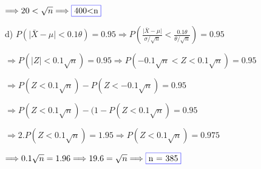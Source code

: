 \documentclass{article}
\providecommand{\abs}[1]{\lvert#1\rvert}
\begin{document}
$\Longrightarrow 20<\sqrt{n} \Longrightarrow \fcolorbox{blue}{white}{400<n}$
\vspace{6mm}

d)
$P(\abs{\bar{X}-\mu}<0.1\theta) = 0.95 \Longrightarrow P(\frac{\abs{\bar{X}-\mu}}{\sigma/\sqrt{n}}<\frac{0.1\theta}{\theta/\sqrt{n}}) = 0.95 $
\vspace{3mm}

$\Longrightarrow P(\abs{Z}<0.1\sqrt{n}) = 0.95 \Longrightarrow P(-0.1\sqrt{n}<Z<0.1\sqrt{n}) = 0.95 $
\vspace{3mm}

$\Longrightarrow P(Z<0.1\sqrt{n})-P(Z<-0.1\sqrt{n}) = 0.95 $
\vspace{3mm}

$\Longrightarrow P(Z<0.1\sqrt{n})-(1 -P(Z<0.1\sqrt{n}) = 0.95 $
\vspace{3mm}

$\Longrightarrow 2.P(Z<0.1\sqrt{n}) = 1.95 \Longrightarrow P(Z<0.1\sqrt{n}) = 0.975 $
\vspace{3mm}

$\Longrightarrow 0.1\sqrt{n} = 1.96 \Longrightarrow 19.6 = \sqrt{n}\Longrightarrow \fcolorbox{blue}{white}{n = 385}$
\end{document}
